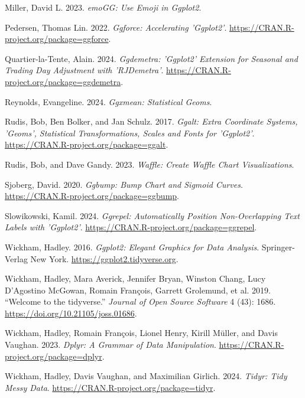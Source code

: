 \documentclass[
  letterpaper,
  DIV=11,
  numbers=noendperiod]{scrreprt}
\newlength{\cslhangindent}
\newenvironment{CSLReferences}[2] %
 {\begin{list}{}{%
  \setlength{\itemindent}{0pt}
  \setlength{\leftmargin}{0pt}
  \setlength{\parsep}{0pt}
  \ifodd #1
   \setlength{\leftmargin}{\cslhangindent}
   \setlength{\itemindent}{-1\cslhangindent}
  \fi
  \setlength{\itemsep}{#2\baselineskip}}}
 {\end{list}}
\begin{document}
\begin{CSLReferences}{1}{0}
Miller, David L. 2023. \emph{emoGG: Use Emoji in Ggplot2}.

Pedersen, Thomas Lin. 2022. \emph{Ggforce: Accelerating 'Ggplot2'}.
\url{https://CRAN.R-project.org/package=ggforce}.

Quartier-la-Tente, Alain. 2024. \emph{Ggdemetra: 'Ggplot2' Extension for
Seasonal and Trading Day Adjustment with 'RJDemetra'}.
\url{https://CRAN.R-project.org/package=ggdemetra}.

Reynolds, Evangeline. 2024. \emph{Ggxmean: Statistical Geoms}.

Rudis, Bob, Ben Bolker, and Jan Schulz. 2017. \emph{Ggalt: Extra
Coordinate Systems, 'Geoms', Statistical Transformations, Scales and
Fonts for 'Ggplot2'}. \url{https://CRAN.R-project.org/package=ggalt}.

Rudis, Bob, and Dave Gandy. 2023. \emph{Waffle: Create Waffle Chart
Visualizations}.

Sjoberg, David. 2020. \emph{Ggbump: Bump Chart and Sigmoid Curves}.
\url{https://CRAN.R-project.org/package=ggbump}.

Slowikowski, Kamil. 2024. \emph{Ggrepel: Automatically Position
Non-Overlapping Text Labels with 'Ggplot2'}.
\url{https://CRAN.R-project.org/package=ggrepel}.

Wickham, Hadley. 2016. \emph{Ggplot2: Elegant Graphics for Data
Analysis}. Springer-Verlag New York.
\url{https://ggplot2.tidyverse.org}.

Wickham, Hadley, Mara Averick, Jennifer Bryan, Winston Chang, Lucy
D'Agostino McGowan, Romain François, Garrett Grolemund, et al. 2019.
{``Welcome to the {tidyverse}.''} \emph{Journal of Open Source Software}
4 (43): 1686. \url{https://doi.org/10.21105/joss.01686}.

Wickham, Hadley, Romain François, Lionel Henry, Kirill Müller, and Davis
Vaughan. 2023. \emph{Dplyr: A Grammar of Data Manipulation}.
\url{https://CRAN.R-project.org/package=dplyr}.

Wickham, Hadley, Davis Vaughan, and Maximilian Girlich. 2024.
\emph{Tidyr: Tidy Messy Data}.
\url{https://CRAN.R-project.org/package=tidyr}.


\end{CSLReferences}
\end{document}
